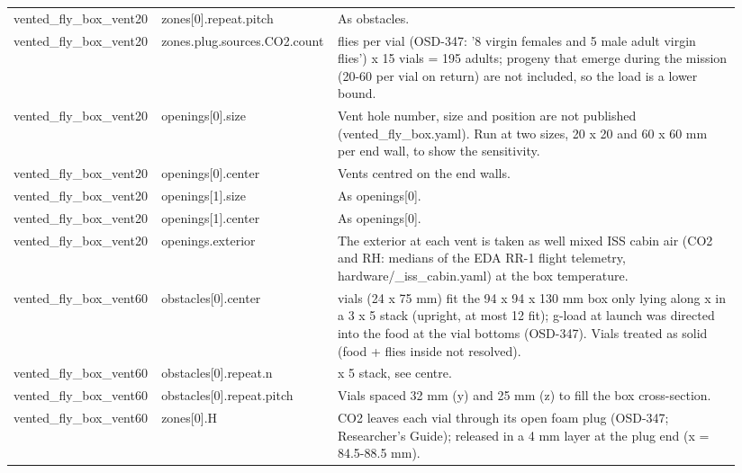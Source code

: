 \begin{longtable}{>{\raggedright\arraybackslash}p{0.17\linewidth}>{\raggedright\arraybackslash}p{0.22\linewidth}>{\raggedright\arraybackslash}p{0.55\linewidth}}
vented\_\allowbreak{}fly\_\allowbreak{}box\_\allowbreak{}vent20 & zones[0]\allowbreak{}.\allowbreak{}repeat.\allowbreak{}pitch & As obstacles. \\
vented\_\allowbreak{}fly\_\allowbreak{}box\_\allowbreak{}vent20 & zones.\allowbreak{}plug.\allowbreak{}sources.\allowbreak{}CO2.\allowbreak{}count & 13 flies per vial (OSD-347: '8 virgin females and 5 male adult virgin flies') x 15 vials = 195 adults; progeny that emerge during the mission (20-60 per vial on return) are not included, so the load is a lower bound. \\
vented\_\allowbreak{}fly\_\allowbreak{}box\_\allowbreak{}vent20 & openings[0]\allowbreak{}.\allowbreak{}size & Vent hole number, size and position are not published (vented\_fly\_box.yaml). Run at two sizes, 20 x 20 and 60 x 60 mm per end wall, to show the sensitivity. \\
vented\_\allowbreak{}fly\_\allowbreak{}box\_\allowbreak{}vent20 & openings[0]\allowbreak{}.\allowbreak{}center & Vents centred on the end walls. \\
vented\_\allowbreak{}fly\_\allowbreak{}box\_\allowbreak{}vent20 & openings[1]\allowbreak{}.\allowbreak{}size & As openings[0]. \\
vented\_\allowbreak{}fly\_\allowbreak{}box\_\allowbreak{}vent20 & openings[1]\allowbreak{}.\allowbreak{}center & As openings[0]. \\
vented\_\allowbreak{}fly\_\allowbreak{}box\_\allowbreak{}vent20 & openings.\allowbreak{}exterior & The exterior at each vent is taken as well mixed ISS cabin air (CO2 and RH: medians of the EDA RR-1 flight telemetry, hardware/\_iss\_cabin.yaml) at the box temperature. \\
vented\_\allowbreak{}fly\_\allowbreak{}box\_\allowbreak{}vent60 & obstacles[0]\allowbreak{}.\allowbreak{}center & 15 vials (24 x 75 mm) fit the 94 x 94 x 130 mm box only lying along x in a 3 x 5 stack (upright, at most 12 fit); g-load at launch was directed into the food at the vial bottoms (OSD-347). Vials treated as solid (food + flies inside not resolved). \\
vented\_\allowbreak{}fly\_\allowbreak{}box\_\allowbreak{}vent60 & obstacles[0]\allowbreak{}.\allowbreak{}repeat.\allowbreak{}n & 3 x 5 stack, see centre. \\
vented\_\allowbreak{}fly\_\allowbreak{}box\_\allowbreak{}vent60 & obstacles[0]\allowbreak{}.\allowbreak{}repeat.\allowbreak{}pitch & Vials spaced 32 mm (y) and 25 mm (z) to fill the box cross-section. \\
vented\_\allowbreak{}fly\_\allowbreak{}box\_\allowbreak{}vent60 & zones[0]\allowbreak{}.\allowbreak{}H & CO2 leaves each vial through its open foam plug (OSD-347; Researcher's Guide); released in a 4 mm layer at the plug end (x = 84.5-88.5 mm). \\

\end{longtable}
